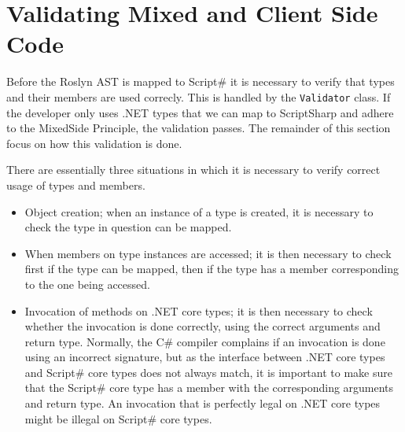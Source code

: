 \section{Validating Mixed and Client Side Code} %
\label{sec:syntax_tree_validation}

	Before the Roslyn AST is mapped to Script\# it is necessary to verify that types and their members are used correcly. This is handled by the \texttt{Validator} class. If the developer only uses .NET types that we can map to ScriptSharp and adhere to the MixedSide Principle, the validation passes. The remainder of this section focus on how this validation is done.




There are essentially three situations in which it is necessary to verify correct usage of types and members.

\begin{itemize}
	\item Object creation; when an instance of a type is created, it is necessary to check the type in question can be mapped.
	\item When members on type instances are accessed; it is then necessary to check first if the type can be mapped, then if the type has a member corresponding to the one being accessed.
	\item Invocation of methods on .NET core types; it is then necessary to check whether the invocation is done correctly, using the correct arguments and return type. Normally, the C\# compiler complains if an invocation is done using an incorrect signature, but as the interface between .NET core types and Script\# core types does not always match, it is important to make sure that the Script\# core type has a member with the corresponding arguments and return type. An invocation that is perfectly legal on .NET core types might be illegal on Script\# core types.
\end{itemize}

